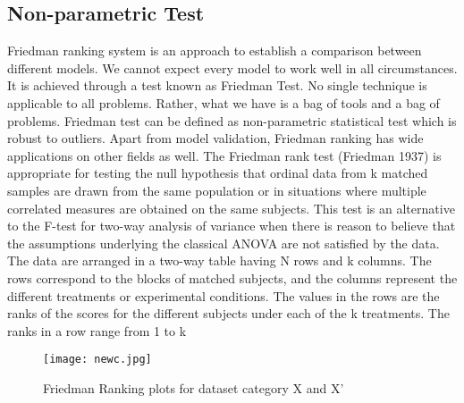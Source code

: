 


\subsection{Non-parametric Test}
Friedman ranking system is an approach to establish a comparison between different models. We cannot expect every model to work well in all circumstances. It is achieved through a test known as Friedman Test. No single technique is applicable to all problems. Rather, what we have is a bag of tools and a bag of problems.\cite{zimmerman1993relative} Friedman test can be defined as non-parametric statistical test which is robust to outliers. Apart from model validation, Friedman ranking has wide applications on other fields as well. The Friedman rank test (Friedman 1937) is appropriate for testing the null hypothesis that ordinal data from k matched samples are drawn from the same population or in situations where multiple correlated measures are obtained on the same subjects. This test is an alternative to the F-test for two-way analysis of variance when there is reason to believe that the assumptions underlying the classical ANOVA are not satisfied by the data. The data are arranged in a two-way table having N rows and k columns. The rows correspond to the blocks of matched subjects, and the columns represent the different treatments or experimental conditions. The values in the rows are the ranks of the scores for the different subjects under each of the k treatments. The ranks in a row range from 1 to k \cite{martin1993tables}\\

\begin{figure*}[!h]
 \centering
 \texttt{[image: newc.jpg]}
 \label{}
 \caption{Friedman Ranking plots for dataset category X and X' }
\end{figure*}



